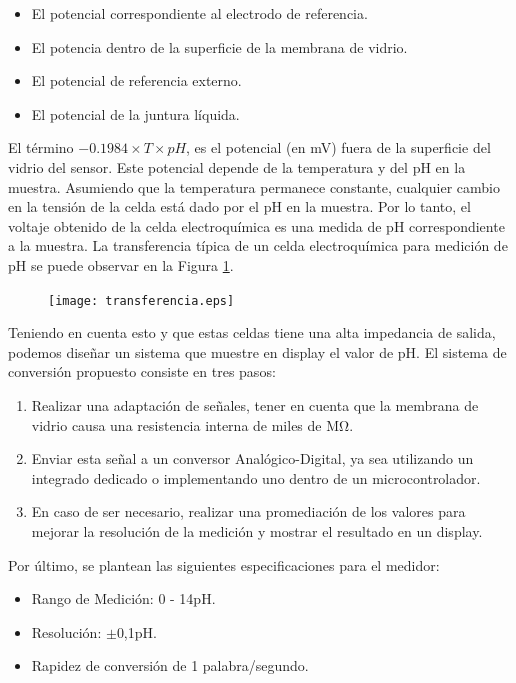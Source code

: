 \documentclass[10pt,a4paper]{article}
\begin{document}
\begin{itemize}
	\item {El potencial correspondiente al electrodo de referencia.}
	\item {El potencia dentro de la superficie de la membrana de vidrio.}
	\item {El potencial de referencia externo.}
	\item {El potencial de la juntura líquida.}
\end{itemize}

El término $-0.1984\times T\times pH$, es el potencial (en mV) fuera de la superficie del vidrio del sensor. Este potencial depende de la temperatura y del pH en la muestra. Asumiendo que la temperatura permanece constante, cualquier cambio en la tensión de la celda está dado por el pH en la muestra. Por lo tanto, el voltaje obtenido de la celda electroquímica es una medida de pH correspondiente a la muestra. La transferencia típica de un celda electroquímica para medición de pH se puede observar en la Figura \ref{fig2}.

\begin{figure}[h!]
	\texttt{[image: transferencia.eps]}
	\label{fig2}
\end{figure}

Teniendo en cuenta esto y que estas celdas tiene una alta impedancia de salida, podemos diseñar un sistema que muestre en display el valor de pH. El sistema de conversión propuesto consiste en tres pasos:

\begin{enumerate}
	\item {Realizar una adaptación de señales, tener en cuenta que la membrana de vidrio causa una resistencia interna de miles de M$\mathrm{\Omega}$.}
	\item {Enviar esta señal a un conversor Analógico-Digital, ya sea utilizando un integrado dedicado o implementando uno dentro de un microcontrolador.}
	\item {En caso de ser necesario, realizar una promediación de los valores para mejorar la resolución de la medición y mostrar el resultado en un display.}
\end{enumerate}

\clearpage

Por último, se plantean las siguientes especificaciones para el medidor:

\begin{itemize}
	\item{Rango de Medición: 0 - 14pH.}
	\item{Resolución: $\mathrm{\pm}$0,1pH.}
	\item {Rapidez de conversión de 1 palabra/segundo.}
\end{itemize}
\end{document}
